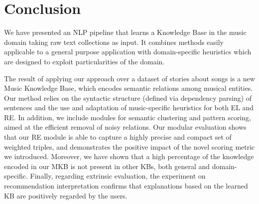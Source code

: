 \section{Conclusion}\label{sec:kb:conclusions}

We have presented an NLP pipeline that learns a Knowledge Base in the music domain taking raw text collections as input. It combines methods easily applicable to a general purpose application with domain-specific heuristics which are designed to exploit particularities of the domain.

The result of applying our approach over a dataset of stories about songs is a new Music Knowledge Base, which encodes semantic relations among musical entities. Our method relies on the syntactic structure (defined via dependency parsing) of sentences and the use and adaptation of music-specific heuristics for both \textsc{EL} and \textsc{RE}. In addition, we include modules for semantic clustering and pattern scoring, aimed at the efficient removal of noisy relations. Our modular evaluation shows that our \textsc{RE} module is able to capture a highly precise and compact set of weighted triples, and demonstrates the positive impact of the novel scoring metric we introduced. Moreover, we have shown that a high percentage of the knowledge encoded in our \textsc{MKB} is not present in other \textsc{KB}s, both general and domain-specific. Finally, regarding extrinsic evaluation, the experiment on recommendation interpretation confirms that explanations based on the learned \textsc{KB} are positively regarded by the users.


